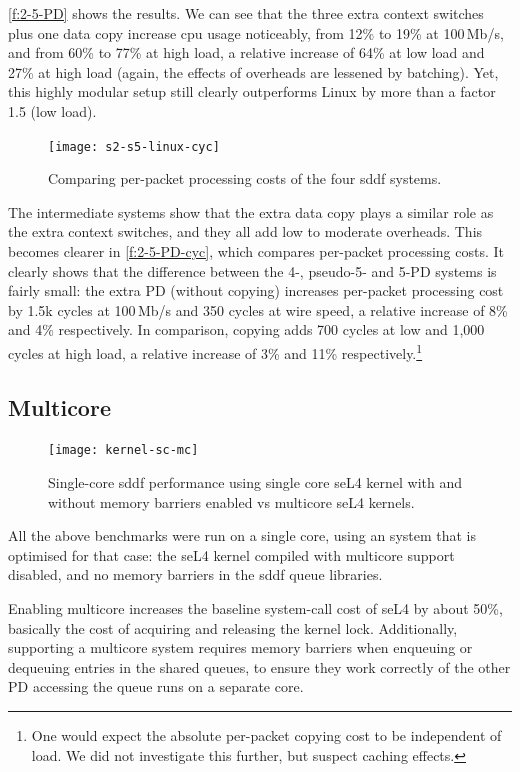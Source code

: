 \documentclass[a4paper,12pt]{report}
\begin{document}
\autoref{f:2-5-PD} shows the results.
We can see that the three extra context switches plus one data copy
increase \gls{cpu} usage noticeably, from 12\% to 19\% at 100\,Mb/s,
and from 60\% to 77\% at high load, a relative increase of 64\%
at low load and 27\% at high load (again, the effects of overheads are
lessened by batching).
Yet, this highly modular setup still clearly outperforms Linux by
more than a factor 1.5 (low load).

\begin{figure}[t]
  \centering
  \texttt{[image: s2-s5-linux-cyc]}
  \caption{Comparing per-packet processing costs of the four \gls{sddf} systems.}
  \label{f:2-5-PD-cyc}
\end{figure}

The intermediate systems show that the extra data copy plays a similar
role as the extra context switches, and they all add low to moderate
overheads. This becomes clearer in \autoref{f:2-5-PD-cyc}, which
compares per-packet processing costs. It clearly shows that the
difference between the 4-, pseudo-5- and 5-PD systems is fairly
small: the extra PD (without copying) increases per-packet processing cost by
1.5k cycles at 100\,Mb/s and 350 cycles
at wire speed, a relative increase of 8\% and 4\% respectively. In
comparison, copying adds 700 cycles at low and 1,000 cycles at high
load, a relative increase of 3\% and 11\% respectively.\footnote{One
  would expect the absolute per-packet copying cost to be independent of
  load. We did not investigate this further, but suspect caching effects.}

\subsection{Multicore}

\begin{figure}[t]
  \centering
  \texttt{[image: kernel-sc-mc]}
  \caption[Single-core \gls{sddf} performance with single- and multicore
  configurations.]{Single-core \gls{sddf} performance using single core seL4
    kernel with and without memory barriers enabled vs multicore
  seL4 kernels.}
  \label{f:kernel-sc-mc}
\end{figure}

All the above benchmarks were run on a single core, using an system
that is optimised for that case: the seL4 kernel compiled with
multicore support disabled, and no memory barriers in the \gls{sddf}
queue libraries.

Enabling multicore increases
the baseline system-call cost of seL4 by about 50\%, basically the
cost of acquiring and releasing the kernel lock. Additionally,
supporting a multicore system requires memory barriers when enqueuing
or dequeuing entries in the shared queues, to ensure they work
correctly of the other PD accessing the queue runs on a separate core.
\end{document}
